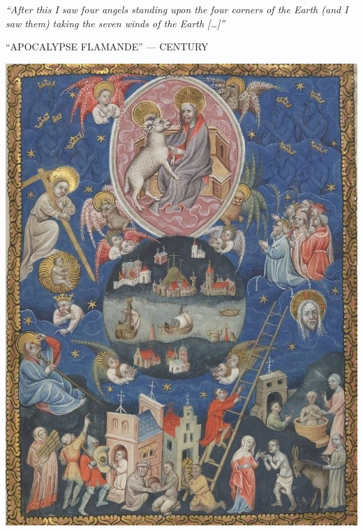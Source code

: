 \begin{pages}
\begin{Leftside}
		\pend
        \endnumbering
    \end{Leftside}

\end{pages} 
\Pages

\clearpage
\thispagestyle{empty}
\null\vfill
\settowidth{}
\begin{center}
\parbox{\longest}{%
  \raggedright{\huge\itshape%
    ``After this I saw four angels standing upon the four corners of the Earth (and I saw them) taking the seven winds of the Earth […]'' \par\bigskip
  }
  \raggedleft\Large\MakeUppercase{``Apocalypse flamande'' —  century}\par%
}
\vfill\vfill
\clearpage\newpage
\end{center}
\newpage
\thispagestyle{empty}
\begin{center}
	\includegraphics[width=1\textwidth]{images/illustrations/angelsholdingwinds.jpg}
\end{center}
